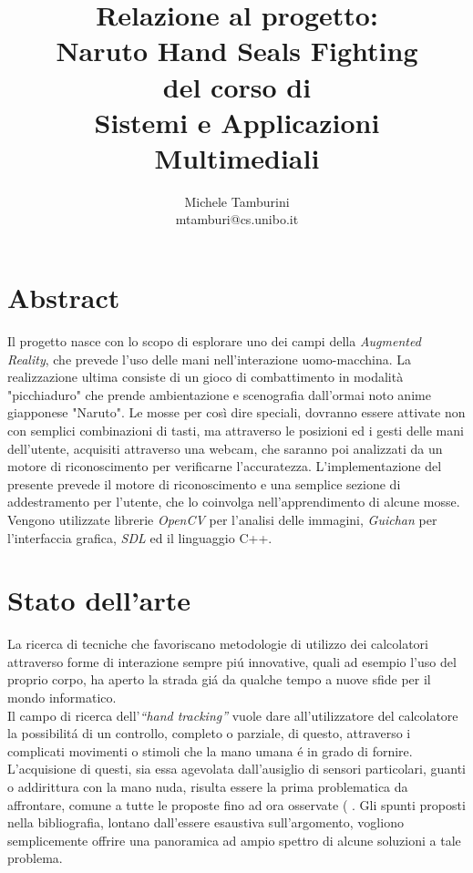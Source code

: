 \documentclass[a4paper,10pt, twocolumn]{article}
\title{Relazione al progetto: \\ Naruto Hand Seals Fighting\\ del corso di\\Sistemi e Applicazioni
Multimediali}
\author{Michele Tamburini \\ mtamburi@cs.unibo.it}
\begin{document}
\maketitle

\section{Abstract}
Il progetto nasce con lo scopo di esplorare uno dei campi della \emph{Augmented Reality}, che
prevede l'uso delle mani nell'interazione uomo-macchina.
La realizzazione ultima consiste di un gioco di combattimento in modalità "picchiaduro"
che prende ambientazione e scenografia dall'ormai noto anime giapponese "Naruto".
Le mosse per così dire speciali, dovranno essere attivate non con semplici
combinazioni di tasti, ma attraverso le posizioni ed i gesti delle mani dell'utente,
acquisiti attraverso una webcam, che saranno poi analizzati da un motore di
riconoscimento per verificarne l'accuratezza.
L'implementazione del presente prevede il 
motore di riconoscimento e una semplice sezione di addestramento
per l'utente, che lo coinvolga nell'apprendimento di alcune mosse.\\
Vengono utilizzate librerie \emph{OpenCV} per l'analisi delle immagini, 
\emph{Guichan} per l'interfaccia grafica, \emph{SDL} ed il linguaggio C++.

\section{Stato dell'arte}
La ricerca di tecniche che favoriscano metodologie di utilizzo dei calcolatori
attraverso forme di interazione sempre pi\'{u} innovative, quali ad esempio
l'uso del proprio corpo, ha aperto la strada gi\'{a} da qualche tempo
a nuove sfide per il mondo informatico.\\
Il campo di ricerca dell'\emph{``hand tracking''} vuole dare all'utilizzatore
del calcolatore la possibilit\'{a} di un controllo, completo o parziale, di questo,
attraverso i complicati movimenti o stimoli che la mano umana \'{e} in grado di fornire.
L'acquisione di questi, sia essa agevolata dall'ausiglio di sensori particolari,
guanti o addirittura con la mano nuda, risulta essere la prima problematica da affrontare,
comune a tutte le proposte fino ad ora osservate (\cite{handTrackHCI} \cite{handTrackNoMarkers}
 \cite{handNavigator} \cite{hugeSurvey} \cite{mitGlove}. 
 Gli spunti proposti nella bibliografia, lontano
dall'essere esaustiva sull'argomento, vogliono semplicemente offrire una panoramica ad ampio
spettro di alcune soluzioni a tale problema.
\end{document}

